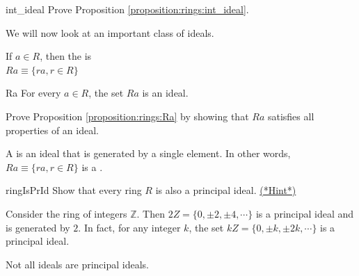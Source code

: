 \begin{exercise}{int_ideal}
Prove Proposition \ref{proposition:rings:int_ideal}.
\end{exercise}

We will now look at an important class of ideals.

\begin{defn}\label{set_gen}
If $a\in R$, then the  is \\
$Ra\equiv \{ra, r\in R\}$
\end{defn}

\begin{prop}{Ra}
For every $a\in R$, the set $Ra$ is an ideal.
\end{prop}

\begin{exercise}{}
Prove Proposition \ref{proposition:rings:Ra} by showing that $Ra$ satisfies all properties of an ideal.
\end{exercise}


\begin{defn}\label{principal_ideal}
A  is an ideal that is generated by a single element. In other words, $Ra\equiv \{ra,r\in R\}$ is a .
\end{defn}

\begin{exercise}{ringIsPrId}
    Show that every ring $R$ is also a principal ideal. \hyperref[ringsHints]{(*Hint*)} 
\end{exercise}

\begin{example}{}
Consider the ring of integers ${\mathbb Z}$. Then $2Z=\{0,\displaystyle \pm 2,\displaystyle \pm 4,\cdots\}$ is a principal ideal and is generated by $2$.  In fact, for any integer $k$, the set  $kZ=\{0,\displaystyle \pm k,\displaystyle \pm 2k,\cdots\}$ is a principal ideal.
\end{example}


Not all ideals are principal ideals.

